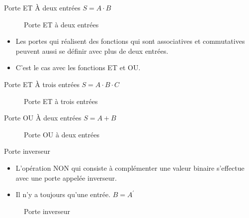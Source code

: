 \documentclass[presentation]{beamer}
\begin{document}
\begin{frame}[label={sec:org064f4d8}]{Porte ET}
À deux entrées \(S =  A \cdot B\)

\begin{figure}[htbp]
\centering

\caption{\label{fig:orgf8b8792}Porte ET à deux entrées}
\end{figure}

\begin{itemize}
\item Les portes qui réalisent des fonctions qui sont associatives et commutatives peuvent aussi se définir avec plus de deux entrées.

\item C'est le cas avec les fonctions ET et OU.
\end{itemize}
\end{frame}

\begin{frame}[label={sec:org5f81a41}]{Porte ET}
À trois entrées \(S =  A \cdot B \cdot C\)

\begin{figure}[htbp]
\centering

\caption{\label{fig:org7f42344}Porte ET à trois entrées}
\end{figure}
\end{frame}

\begin{frame}[label={sec:org149cbff}]{Porte OU}
À deux entrées \(S =  A + B\)

\begin{figure}[htbp]
\centering

\caption{\label{fig:org5b7917f}Porte OU à deux entrées}
\end{figure}
\end{frame}

\begin{frame}[label={sec:org3509f3c}]{Porte inverseur}
\begin{itemize}
\item L'opération NON qui consiste à complémenter une valeur binaire s'effectue avec une porte appelée \alert{inverseur}.

\item Il n'y a toujours qu'une entrée. \(B = A^\prime\)
\end{itemize}

\begin{figure}[htbp]
\centering

\caption{\label{fig:org489ba29}Porte inverseur}
\end{figure} 
\end{frame}
\end{document}
